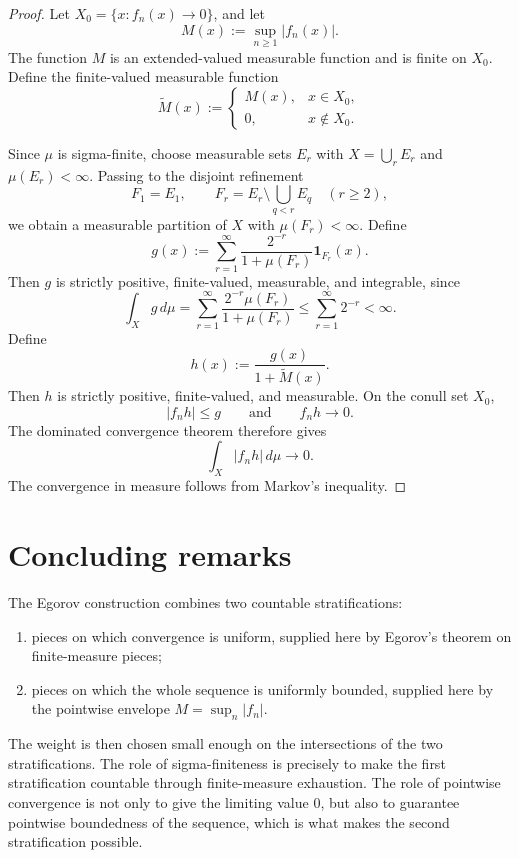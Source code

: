 \documentclass[11pt]{article}
\newcommand{\one}{\mathbf 1}
\theoremstyle{plain}
\theoremstyle{definition}
\theoremstyle{remark}
\begin{document}
\begin{proof}
Let $X_0=\{x:f_n(x)\to 0\}$, and let
\[
        M(x):=\sup_{n\geq 1}|f_n(x)|.
\]
The function $M$ is an extended-valued measurable function and is finite on
$X_0$.  Define the finite-valued measurable function
\[
        \widetilde M(x):=
        \begin{cases}
        M(x), & x\in X_0,\\
        0, & x\notin X_0.
        \end{cases}
\]

Since $\mu$ is sigma-finite, choose measurable sets $E_r$ with
$X=\bigcup_r E_r$ and $\mu(E_r)<\infty$.  Passing to the disjoint refinement
\[
        F_1=E_1,
        \qquad
        F_r=E_r\setminus\bigcup_{q<r}E_q\quad(r\geq 2),
\]
we obtain a measurable partition of $X$ with $\mu(F_r)<\infty$.  Define
\[
        g(x):=\sum_{r=1}^\infty
        \frac{2^{-r}}{1+\mu(F_r)}\one_{F_r}(x).
\]
Then $g$ is strictly positive, finite-valued, measurable, and integrable,
since
\[
        \int_X g\,d\mu
        =
        \sum_{r=1}^\infty
        \frac{2^{-r}\mu(F_r)}{1+\mu(F_r)}
        \leq
        \sum_{r=1}^\infty 2^{-r}<\infty.
\]
Define
\[
        h(x):=\frac{g(x)}{1+\widetilde M(x)}.
\]
Then $h$ is strictly positive, finite-valued, and measurable.  On the conull
set $X_0$,
\[
        |f_nh|
        \leq g
        \qquad\text{and}\qquad
        f_nh\to 0.
\]
The dominated convergence theorem therefore gives
\[
        \int_X |f_nh|\,d\mu\to 0.
\]
The convergence in measure follows from Markov's inequality.
\end{proof}

\section{Concluding remarks}

The Egorov construction combines two countable stratifications:
\begin{enumerate}[label=\textup{(\roman*)},leftmargin=2.5em]
    \item pieces on which convergence is uniform, supplied here by Egorov's
    theorem on finite-measure pieces;
    \item pieces on which the whole sequence is uniformly bounded, supplied
    here by the pointwise envelope $M=\sup_n |f_n|$.
\end{enumerate}
The weight is then chosen small enough on the intersections of the two
stratifications.  The role of sigma-finiteness is precisely to make the first
stratification countable through finite-measure exhaustion.  The role of
pointwise convergence is not only to give the limiting value $0$, but also to
guarantee pointwise boundedness of the sequence, which is what makes the
second stratification possible.
\end{document}
